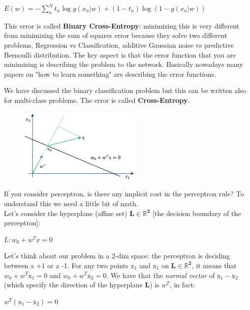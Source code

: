 \begin{center}
    $E(w)=-\sum_{n}^{N} t_{n} \log g\left(x_{n} | w\right)+\left(1-t_{n}\right) \log \left(1-g\left(x_{n} | w\right)\right)$
\end{center}
This error is called \textbf{Binary Cross-Entropy}:
minimizing this is very different from minimizing the sum of squares error because they solve two different problems,  Regression vs Classification, additive Gaussian noise vs predictive Bernoulli distribution. The key aspect is that the error function that you are minimizing is describing the problem to the network. Basically nowadays many papers on "how to learn something" are describing the error functions. 

We have discussed the binary classification problem but this can be written also for multi-class problems. The error is called \textbf{Cross-Entropy}. \\

\begin{figure}
    \includegraphics[width=6cm]{images/perceptron_decbound.png}
\end{figure} 

If you consider perceptron, is there any implicit cost in the perceptron rule? To understand this we need a little bit of math. \\
Let's consider the hyperplane (affine set) $\boldsymbol{L \in \mathbb{R}^2}$ [the decision boundary of the perceptron]:

\begin{center}
    $L: w_{0}+w^{T} x=0$
\end{center}
Let's think about our problem in a 2-dim space: the perceptron is deciding between a +1 or a -1. For any two points $\mathrm{x}_{1}$ and $\mathrm{x}_{1}$ on $\boldsymbol{L \in \mathbb{R}^2}$, it means that $w_0 + w^T \mathrm{x}_{1}=0$ and $w_0 + w^T \mathrm{x}_{2}=0$. We have that the \textit{normal vector} of $\mathrm{x}_{1} - \mathrm{x}_{2}$ (which specify the direction of the hyperplane $\boldsymbol{L}$) is $w^T$, in fact:
\begin{center}
    $w^{T}\left(\mathrm{x}_{1}-\mathrm{x}_{2}\right)=0$
\end{center}

